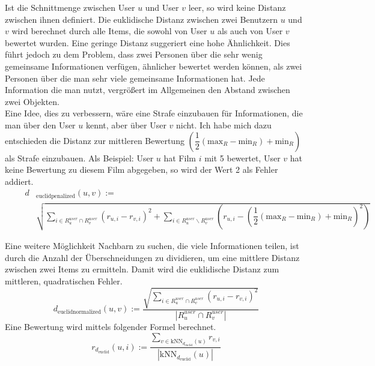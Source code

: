 Ist die Schnittmenge zwischen User $u$ und User $v$ leer, so wird keine Distanz zwischen ihnen definiert.
Die euklidische Distanz zwischen zwei Benutzern $u$ und $v$ wird berechnet durch alle Items, die sowohl von User $u$ als auch von User $v$ bewertet wurden. Eine geringe Distanz suggeriert eine hohe Ähnlichkeit. Dies führt jedoch zu dem Problem, dass zwei Personen über die sehr wenig gemeinsame Informationen verfügen, ähnlicher bewertet werden können, als zwei Personen über die man sehr viele gemeinsame Informationen hat. Jede Information die man nutzt, vergrößert im Allgemeinen den Abstand zwischen zwei Objekten.\\
Eine Idee, dies zu verbessern, wäre eine Strafe einzubauen für Informationen, die man über den User $u$ kennt, aber über User $v$ nicht.
Ich habe mich dazu entschieden die Distanz zur mittleren Bewertung $(\dfrac{1}{2}(\mathrm{max}_{R}-\mathrm{min}_{R})+\mathrm{min}_{R})$ als Strafe einzubauen. Als Beispiel: User $u$ hat Film $i$ mit 5 bewertet, User $v$ hat keine Bewertung zu diesem Film abgegeben, so wird der Wert 2 als Fehler addiert.
\begin{equation}
\begin{aligned}
\qquad	d&_{\mathrm{euclidpenalized}}(u,v) := \\ &\sqrt{\sum\limits_{i \in R^{user}_{u}\cap R^{user}_{v}} (r_{u,i}-r_{v,i})^2  + \sum\limits_{i \in R^{user}_{u}\backslash R^{user}_{v}} (r_{u,i}-(\dfrac{1}{2}(\mathrm{max}_{R}-\mathrm{min}_{R})+\mathrm{min}_{R})^2) }
	\label{euclidpenalty}
\end{aligned}
\end{equation}

Eine weitere Möglichkeit Nachbarn zu suchen, die viele Informationen teilen, ist durch die Anzahl der Überschneidungen zu dividieren, um eine mittlere Distanz zwischen zwei Items zu ermitteln. Damit wird die euklidische Distanz zum mittleren, quadratischen Fehler.
\begin{equation}
d_{\mathrm{euclidnormalized}}(u,v) := \dfrac{\sqrt{\sum\limits_{i \in R^{user}_{u}\cap R^{user}_{v}} (r_{u,i}-r_{v,i})^2  }}{|R^{user}_{u}\cap R^{user}_{v}|}
\label{euclidmean}
\end{equation}
Eine Bewertung wird mittels folgender Formel berechnet.
\begin{equation}
r_{d_{\mathrm{euclid}}}(u,i) := \dfrac{\sum\limits_{v \in \mathrm{kNN}_{d_{\mathrm{euclid}}}(u)} r_{v,i}}{|\mathrm{kNN}_{d_{\mathrm{euclid}}}(u)|}  
\label{euklidrating}
\end{equation}

